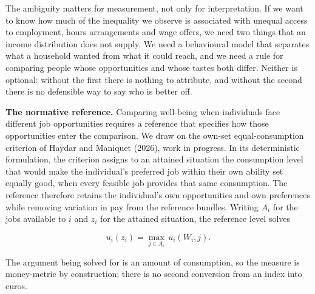 \documentclass[11pt,a4paper]{article}
\begin{document}
The ambiguity matters for measurement, not only for interpretation. If we want to know how much of the inequality we observe is associated with unequal access to employment, hours arrangements and wage offers, we need two things that an income distribution does not supply. We need a behavioural model that separates what a household wanted from what it could reach, and we need a rule for comparing people whose opportunities and whose tastes both differ. Neither is optional: without the first there is nothing to attribute, and without the second there is no defensible way to say who is better off.

\textbf{The normative reference.} Comparing well-being when individuals face different job opportunities requires a reference that specifies how those opportunities enter the comparison. We draw on the own-set equal-consumption criterion of Haydar and Maniquet (2026), work in progress. In its deterministic formulation, the criterion assigns to an attained situation the consumption level that would make the individual's preferred job within their own ability set equally good, when every feasible job provides that same consumption. The reference therefore retains the individual's own opportunities and own preferences while removing variation in pay from the reference bundles. Writing \(A_i\) for the jobs available to \(i\) and \(z_i\) for the attained situation, the reference level solves

\[u_i(z_i)=\max_{j\in A_i}\,u_i(W_i,j).\]

The argument being solved for is an amount of consumption, so the measure is money-metric by construction; there is no second conversion from an index into euros.
\end{document}
